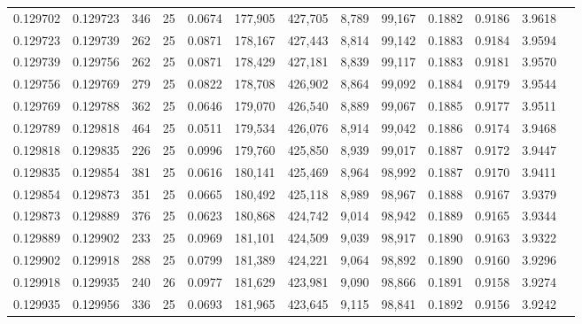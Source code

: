 \begin{tabular}{rrrrrrrrrrrrr}
0.129702 & 0.129723 &   346 &  25 &                                     0.0674 & 177,905 & 427,705 &   8,789 &  99,167 & 0.1882 & 0.9186 & 3.9618 \\
0.129723 & 0.129739 &   262 &  25 &                                     0.0871 & 178,167 & 427,443 &   8,814 &  99,142 & 0.1883 & 0.9184 & 3.9594 \\
0.129739 & 0.129756 &   262 &  25 &                                     0.0871 & 178,429 & 427,181 &   8,839 &  99,117 & 0.1883 & 0.9181 & 3.9570 \\
0.129756 & 0.129769 &   279 &  25 &                                     0.0822 & 178,708 & 426,902 &   8,864 &  99,092 & 0.1884 & 0.9179 & 3.9544 \\
0.129769 & 0.129788 &   362 &  25 &                                     0.0646 & 179,070 & 426,540 &   8,889 &  99,067 & 0.1885 & 0.9177 & 3.9511 \\
0.129789 & 0.129818 &   464 &  25 &                                     0.0511 & 179,534 & 426,076 &   8,914 &  99,042 & 0.1886 & 0.9174 & 3.9468 \\
0.129818 & 0.129835 &   226 &  25 &                                     0.0996 & 179,760 & 425,850 &   8,939 &  99,017 & 0.1887 & 0.9172 & 3.9447 \\
0.129835 & 0.129854 &   381 &  25 &                                     0.0616 & 180,141 & 425,469 &   8,964 &  98,992 & 0.1887 & 0.9170 & 3.9411 \\
0.129854 & 0.129873 &   351 &  25 &                                     0.0665 & 180,492 & 425,118 &   8,989 &  98,967 & 0.1888 & 0.9167 & 3.9379 \\
0.129873 & 0.129889 &   376 &  25 &                                     0.0623 & 180,868 & 424,742 &   9,014 &  98,942 & 0.1889 & 0.9165 & 3.9344 \\
0.129889 & 0.129902 &   233 &  25 &                                     0.0969 & 181,101 & 424,509 &   9,039 &  98,917 & 0.1890 & 0.9163 & 3.9322 \\
0.129902 & 0.129918 &   288 &  25 &                                     0.0799 & 181,389 & 424,221 &   9,064 &  98,892 & 0.1890 & 0.9160 & 3.9296 \\
0.129918 & 0.129935 &   240 &  26 &                                     0.0977 & 181,629 & 423,981 &   9,090 &  98,866 & 0.1891 & 0.9158 & 3.9274 \\
0.129935 & 0.129956 &   336 &  25 &                                     0.0693 & 181,965 & 423,645 &   9,115 &  98,841 & 0.1892 & 0.9156 & 3.9242 \\

\end{tabular}
